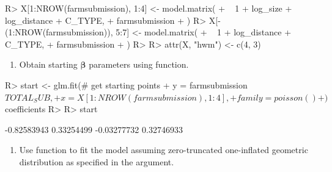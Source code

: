 \documentclass[
]{jss}
\providecommand{\tightlist}{%
  \setlength{\itemsep}{0pt}\setlength{\parskip}{0pt}}
\newcommand{\1}{\mathcal{I}} \newcommand{\bZero}{\boldsymbol{0}}
\begin{document}
\begin{CodeChunk}
\begin{CodeInput}
R> X[1:NROW(farmsubmission), 1:4] <- model.matrix(
+   ~ 1 + log_size + log_distance + C_TYPE, 
+   farmsubmission
+ )
R> X[-(1:NROW(farmsubmission)), 5:7] <- model.matrix(
+   ~ 1 + log_distance + C_TYPE, 
+   farmsubmission
+ )
R> 
R> attr(X, "hwm") <- c(4, 3)
\end{CodeInput}
\end{CodeChunk}

\begin{enumerate}
\def\labelenumi{\arabic{enumi}.}
\setcounter{enumi}{2}
\tightlist
\item
  Obtain starting \(\boldsymbol{\beta}\) parameters using 
  function.
\end{enumerate}

\begin{CodeChunk}
\begin{CodeInput}
R> start <- glm.fit(# get starting points
+   y = farmsubmission$TOTAL_SUB, 
+   x = X[1:NROW(farmsubmission), 1:4], 
+   family = poisson()
+ )$coefficients
R> 
R> start
\end{CodeInput}
\begin{CodeOutput}
[1] -0.82583943  0.33254499 -0.03277732  0.32746933
\end{CodeOutput}
\end{CodeChunk}

\begin{enumerate}
\def\labelenumi{\arabic{enumi}.}
\setcounter{enumi}{3}
\tightlist
\item
  Use  function to fit the model assuming
  zero-truncated one-inflated geometric distribution as specified in the
   argument.
\end{enumerate}

\begin{CodeChunk}
\end{CodeChunk}
\end{document}
